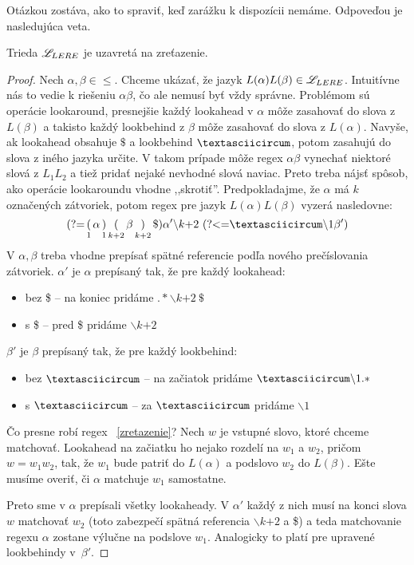 Otázkou zostáva, ako to spraviť, keď zarážku k dispozícii nemáme. Odpoveďou je nasledujúca veta.

\begin{veta}
Trieda $\mathscr{L}_{LERE}$ je uzavretá na zreťazenie.
\end{veta}
\begin{proof}
Nech $\alpha, \beta\in \le$. Chceme ukázať, že jazyk $L(\alpha)L(\beta) \in \mathscr{L}_{LERE}$. Intuitívne nás to vedie k riešeniu $\alpha\beta$, čo ale nemusí byť vždy správne. Problémom sú operácie lookaround, presnejšie každý lookahead v $\alpha$ môže zasahovať do slova z $L(\beta)$ a takisto každý lookbehind z $\beta$ môže zasahovať do slova z $L(\alpha)$. Navyše, ak lookahead obsahuje $\$$ a lookbehind $\textasciicircum$, potom zasahujú do slova z iného jazyka určite. V takom prípade môže regex $\alpha\beta$ vynechať niektoré slová z $L_1L_2$ a tiež pridať nejaké nevhodné slová naviac. Preto treba nájsť spôsob, ako operácie lookaroundu vhodne ,,skrotiť''. Predpokladajme, že $\alpha$ má $k$ označených zátvoriek, potom regex pre jazyk $L(\alpha)L(\beta)$ vyzerá nasledovne:
\begin{equation} \label{zretazenie}
\lookahead \mathop(_1 \alpha \mathop)_1 \mathop(_{k+2}\beta \mathop)_{k+2} \mathdollar) \alpha ' \backslash \text{$k$+2} ~\lookbehind \textasciicircum\backslash 1\beta ')
\end{equation}
V $\alpha,\beta$ treba vhodne prepísať spätné referencie podľa nového prečíslovania zátvoriek. $\alpha '$ je $\alpha$ prepísaný tak, že pre každý lookahead:
\begin{itemize}
\item bez \$ -- na koniec pridáme $.* \backslash \text{$k$+2} ~\mathdollar $
\item s \$ -- pred \$ pridáme $\backslash \text{$k$+2}$
\end{itemize}
$\beta '$ je $\beta$ prepísaný tak, že pre každý lookbehind:
\begin{itemize}
\item bez $\textasciicircum$ -- na začiatok pridáme $\textasciicircum \backslash 1.*$
\item s $\textasciicircum$ -- za $\textasciicircum$ pridáme $ \backslash 1$
\end{itemize}
Čo presne robí regex ~\ref{zretazenie}? Nech $w$ je vstupné slovo, ktoré chceme matchovať. Lookahead na začiatku ho nejako rozdelí na $w_1$ a $w_2$, pričom $w=w_1w_2$, tak, že $w_1$ bude patriť do $L(\alpha)$ a podslovo $w_2$ do $L(\beta)$. Ešte musíme overiť, či $\alpha$ matchuje $w_1$ samostatne.

Preto sme v $\alpha$ prepísali všetky lookaheady. V $\alpha '$ každý z nich musí na konci slova $w$ matchovať $w_2$ (toto zabezpečí spätná referencia $\backslash \text{$k$+2}$ a \$) a teda matchovanie regexu $\alpha$ zostane výlučne na podslove $w_1$. Analogicky to platí pre upravené lookbehindy v~$\beta '$.

\end{proof}

